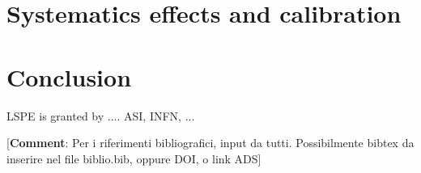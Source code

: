 \documentclass{aa}
\newcommand{\comment}[1]{{\textcolor[rgb]{1, 0, 0}{[{\bf Comment}: #1]}}}
\begin{document}
\section{Systematics effects and calibration}\label{sec:systematics}


\section{Conclusion}\label{sec:conclusion}


 \begin{acknowledgements} 
 LSPE is granted by .... ASI, INFN, ...
\end{acknowledgements}


\comment{Per i riferimenti bibliografici, input da tutti. Possibilmente bibtex da inserire nel file biblio.bib, oppure DOI, o link ADS}
\end{document}
